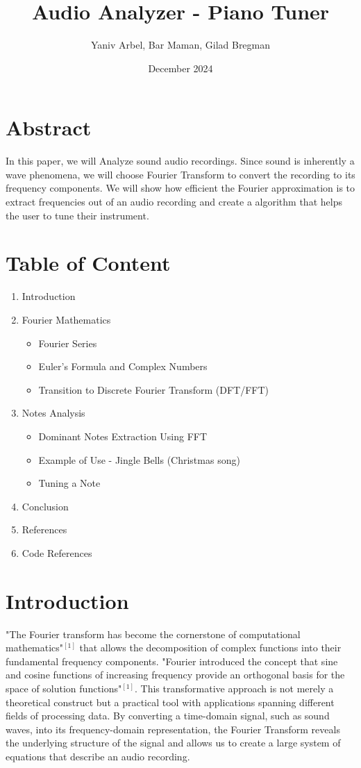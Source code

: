 \documentclass{article}
\title{Audio Analyzer - Piano Tuner}
\author{Yaniv Arbel, Bar Maman, Gilad Bregman}
\date{December 2024}
\begin{document}
\maketitle

\section*{Abstract}

In this paper, we will Analyze sound audio recordings. Since sound is inherently a wave phenomena, we will choose Fourier Transform to convert the recording to its frequency components. We will show how efficient the Fourier approximation is to extract frequencies out of an audio recording and create a algorithm that helps the user to tune their instrument. 

\section*{Table of Content}
\begin{enumerate}
    \item Introduction
    \item Fourier Mathematics
    \begin{itemize}
        \item Fourier Series
        \item Euler's Formula and Complex Numbers
        \item Transition to Discrete Fourier Transform (DFT/FFT)
    \end{itemize}
    \item Notes Analysis
    \begin{itemize}
        \item Dominant Notes Extraction Using FFT
        \item Example of Use - Jingle Bells (Christmas song)
        \item Tuning a Note
    \end{itemize}
    \item Conclusion
    \item References
    \item Code References
\end{enumerate}


\section*{Introduction}
"The Fourier transform has become the cornerstone of computational mathematics"$^{[1]}$ that allows the decomposition of complex functions into their fundamental frequency components. "Fourier introduced the concept that sine and cosine functions of increasing frequency provide an orthogonal basis for the space of solution functions"$^{[1]}$. This transformative approach is not merely a theoretical construct but a practical tool with applications spanning different fields of processing data. By converting a time-domain signal, such as sound waves, into its frequency-domain representation, the Fourier Transform reveals the underlying structure of the signal and allows us to create a large system of equations that describe an audio recording.
\end{document}
